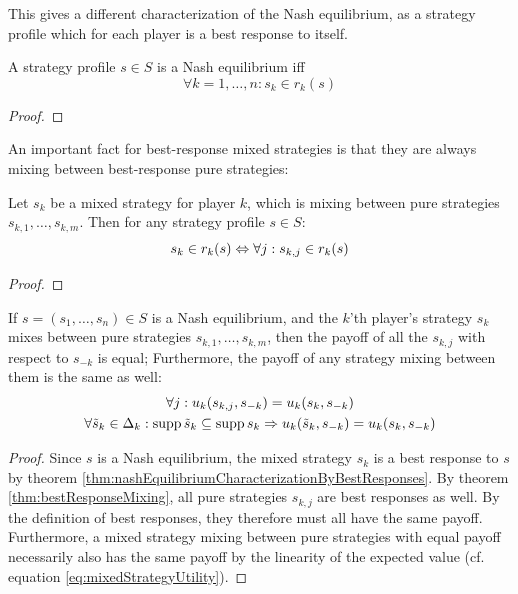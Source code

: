\documentclass[a4paper]{scrreprt}
\begin{document}
    This gives a different characterization of the Nash equilibrium, as a strategy profile which for each player is a best response to itself.
    
    \begin{thm}
        A strategy profile $s \in S$ is a Nash equilibrium iff 
        \[
            \forall k = 1, \dots, n: s_k \in r_k(s)
        \]
        \label{thm:nashEquilibriumCharacterizationByBestResponses}
    \end{thm}
    \begin{proof}
    \end{proof}

    An important fact for best-response mixed strategies is that they are always mixing between best-response pure strategies:

    \begin{thm}
        Let $s_k$ be a mixed strategy for player $k$, which is mixing between pure strategies $s_{k,1}, \dots, s_{k,m}$.
        Then for any strategy profile $s \in S$:
        \[
            s_k \in r_k(s) \Leftrightarrow \forall j: s_{k, j} \in r_k(s)
        \]
        \label{thm:bestResponseMixing}
    \end{thm}
    \begin{proof}
    \end{proof}

    \begin{cor}
        If $s = (s_1, \dots, s_n) \in S$ is a Nash equilibrium, and the $k$'th player's strategy $s_k$
        mixes between pure strategies $s_{k,1}, \dots, s_{k,m}$, then the payoff of all the $s_{k,j}$ with respect to $s_{-k}$ is equal;
        Furthermore, the payoff of any strategy mixing between them is the same as well:
        \begin{gather}
            \forall j: u_k(s_{k,j}, s_{-k}) = u_k(s_k, s_{-k}) \\
            \forall \tilde{s}_k \in \Delta_k: \operatorname{supp} \tilde{s}_k \subseteq \operatorname{supp} s_k \Rightarrow u_k(\tilde{s}_k, s_{-k}) = u_k(s_k, s_{-k})
        \end{gather}
        \label{cor:equilibriumStrategiesSupportHaveEqualPayoffs}
    \end{cor}
    \begin{proof}
        Since $s$ is a Nash equilibrium, the mixed strategy $s_k$ is a best response to $s$ by theorem \ref{thm:nashEquilibriumCharacterizationByBestResponses}.
        By theorem \ref{thm:bestResponseMixing}, all pure strategies $s_{k, j}$ are best responses as well.
        By the definition of best responses, they therefore must all have the same payoff.
        Furthermore, a mixed strategy mixing between pure strategies with equal payoff necessarily also has the same payoff by the linearity of the expected value (cf. equation \eqref{eq:mixedStrategyUtility}).
    \end{proof}
    
\end{document}
